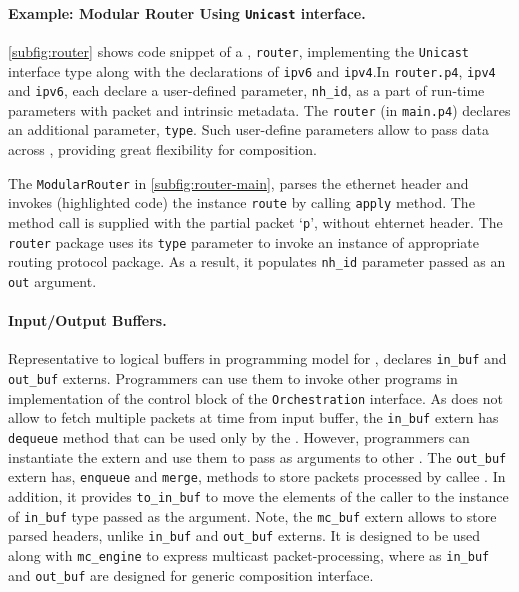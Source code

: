 \documentclass[letterpaper,twocolumn,10pt]{article}
\begin{document}

\paragraph{Example: Modular Router Using \texttt{Unicast} interface.}
\cref{subfig:router} shows code snippet of a \upackage, 
\texttt{router}, implementing the \texttt{Unicast} interface type 
along with the declarations of \upackages \texttt{ipv6} and 
\texttt{ipv4}.\footnotemark[\value{footnote}] In 
\texttt{router.p4}, \texttt{ipv4} and \texttt{ipv6}, each declare 
a user-defined parameter, \texttt{nh\_id}, as a part of run-time 
parameters with packet and intrinsic metadata. The 
\texttt{router} (in \texttt{main.p4}) declares an additional 
parameter, \texttt{type}. Such user-define parameters allow to pass 
data across \upackages, providing great flexibility for composition.

The \texttt{ModularRouter} \uprogram in 
\cref{subfig:router-main}, parses the ethernet header and invokes 
(highlighted code) the instance \texttt{route} by calling 
\texttt{apply} method. The method call is supplied with the partial 
packet `\texttt{p}', without ehternet header. The \texttt{router} 
package uses its \texttt{type} parameter to invoke an instance of 
appropriate routing protocol package. As a result, it populates 
\texttt{nh\_id} parameter passed as an \texttt{out} argument.


\paragraph{Input/Output Buffers.}
Representative to logical buffers in programming model for \uswitch, 
\uarch declares \texttt{in\_buf} and \texttt{out\_buf} externs. 
Programmers can use them to invoke other programs in implementation 
of 
the control block of the \texttt{Orchestration} interface. As 
\uswitch does not allow to fetch multiple packets at time from input 
buffer, the \texttt{in\_buf} extern has \texttt{dequeue} method that 
can be used only by the \uswitch. However, programmers can 
instantiate 
the extern and use them to pass as arguments to other 
\upackages. The \texttt{out\_buf} extern has, \texttt{enqueue} 
and \texttt{merge}, methods to store packets processed by callee 
\upackages. In addition, it provides \texttt{to\_in\_buf} to move the 
elements of the caller to the instance of \texttt{in\_buf} type
passed as the argument. Note, the \texttt{mc\_buf} extern allows to 
store parsed headers, unlike \texttt{in\_buf} and \texttt{out\_buf} 
externs. It is designed to be used along with \texttt{mc\_engine} to 
express multicast packet-processing, where as \texttt{in\_buf} and 
\texttt{out\_buf} are designed for generic composition interface.
\end{document}
